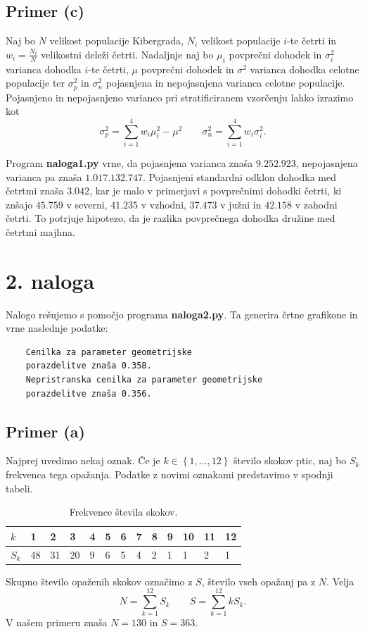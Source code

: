 \documentclass[a4paper,11pt]{article}
\newcommand{\set}[1]{\left\{#1\right\}} %
\begin{document}
\subsection*{Primer (c)}

Naj bo $N$ velikost populacije Kibergrada, $N_i$ velikost populacije $i$-te četrti in $w_i = \frac{N_i}{N}$ velikostni deleži četrti.
Nadaljnje naj bo $\mu_i$ povprečni dohodek in $\sigma_i^2$ varianca dohodka $i$-te četrti,
$\mu$ povprečni dohodek in $\sigma^2$ varianca dohodka celotne populacije ter $\sigma^2_p$ in $\sigma^2_n$ pojasnjena in nepojasnjena varianca celotne populacije.
Pojasnjeno in nepojasnjeno varianco pri stratificiranem vzorčenju lahko izrazimo kot
\[\sigma^2_p = \sum_{i=1}^4 w_i \mu_i^2 - \mu^2 \qquad \sigma^2_n = \sum_{i=1}^4 w_i \sigma_i^2.\]

Program \textbf{naloga1.py} vrne, da pojasnjena varianca znaša $9.252.923$, nepojasnjena varianca pa znaša $1.017.132.747$.
Pojasnjeni standardni odklon dohodka med četrtmi znaša $3.042$, kar je malo v primerjavi s povprečnimi dohodki četrti,
ki znšajo $45.759$ v severni, $41.235$ v vzhodni, $37.473$ v južni in $42.158$ v zahodni četrti.
To potrjuje hipotezo, da je razlika povprečnega dohodka družine med četrtmi majhna.


\section*{2. naloga}

Nalogo rešujemo s pomočjo programa \textbf{naloga2.py}. 
Ta generira črtne grafikone in vrne naslednje podatke:
\begin{verbatim}
    Cenilka za parameter geometrijske 
    porazdelitve znaša 0.358.
    Nepristranska cenilka za parameter geometrijske 
    porazdelitve znaša 0.356.
\end{verbatim}

\subsection*{Primer (a)}

Najprej uvedimo nekaj oznak. 
Če je $k \in \set{1, \ldots, 12}$ število skokov ptic, naj bo $S_k$ frekvenca tega opažanja.
Podatke z novimi oznakami predstavimo v spodnji tabeli.
\begin{table}[H]
    \centering
    \begin{tabular}{|l|l|l|l|l|l|l|l|l|l|l|l|l|}
    \hline
    $k$ & 1 & 2 & 3 & 4 & 5 & 6 & 7 & 8 & 9 & 10 & 11 & 12 \\ \hline
    $S_k$ & 48 & 31 & 20 & 9 & 6 & 5 & 4 & 2 & 1 & 1 & 2 & 1 \\ \hline
    \end{tabular}
    \caption{Frekvence števila skokov.}
    \label{freq}
\end{table}
\noindent Skupno število opaženih skokov označimo z $S$, število vseh opažanj pa z $N$.
Velja
\[N = \sum_{k=1}^{12} S_k \qquad S = \sum_{k=1}^{12} k S_k.\]
V našem primeru znaša $N = 130$ in $S = 363$.
\end{document}

